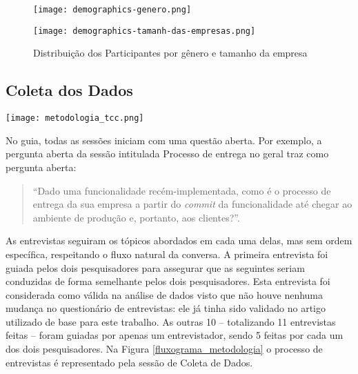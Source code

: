 \begin{figure}
\begin{minipage}{.21\textwidth}
    \centering
    \texttt{[image: demographics-genero.png]}
\end{minipage}%
\begin{minipage}{.25\textwidth}
    \centering
    \texttt{[image: demographics-tamanh-das-empresas.png]}
\end{minipage}
\caption{
    Distribuição dos Participantes por gênero e tamanho da empresa
    }
    \label{genero_e_tamanho}
\end{figure}


\subsection{Coleta dos Dados}

\begin{figure*}[ht]
\begin{center}
\texttt{[image: metodologia\_tcc.png]}
\end{center}
\caption[Fluxograma da Metodologia]{
    Visão geral dos processos de coleta e análise de dados.
}\label{fluxograma_metodologia}
\end{figure*}

No guia, todas as sessões iniciam com uma questão aberta. Por exemplo, a pergunta aberta da sessão intitulada Processo de entrega no geral traz como pergunta aberta:

\begin{quote}
    ``Dado uma funcionalidade recém-implementada, como é o processo de entrega da sua empresa a partir do \emph{commit} da funcionalidade até chegar ao ambiente de produção e, portanto, aos clientes?''.
\end{quote} 

As entrevistas seguiram os tópicos abordados em cada uma delas, mas sem ordem específica, respeitando o fluxo natural da conversa. A primeira entrevista foi guiada pelos dois pesquisadores para assegurar que as seguintes seriam conduzidas de forma semelhante pelos dois pesquisadores. Esta entrevista foi considerada como válida na análise de dados visto que não houve nenhuma mudança no questionário de entrevistas: ele já tinha sido validado no artigo utilizado de base para este trabalho. As outras 10 -- totalizando 11 entrevistas feitas -- foram guiadas por apenas um entrevistador, sendo 5 feitas por cada um dos dois pesquisadores. Na Figura \ref{fluxograma_metodologia} o processo de entrevistas é representado pela sessão de Coleta de Dados.

